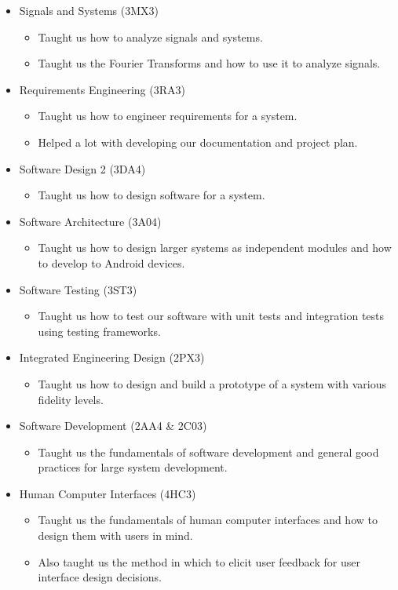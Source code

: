 \documentclass{article}
\begin{document}
\begin{itemize}
    \item Signals and Systems (3MX3)
    \begin{itemize}
        \item Taught us how to analyze signals and systems.
        \item Taught us the Fourier Transforms and how to use it to analyze 
        signals.
    \end{itemize}
    \item Requirements Engineering (3RA3)
    \begin{itemize}
        \item Taught us how to engineer requirements for a system.
        \item Helped a lot with developing our documentation and project plan. 
    \end{itemize}
    \item Software Design 2 (3DA4)
    \begin{itemize}
        \item Taught us how to design software for a system.
    \end{itemize}
    \item Software Architecture (3A04)
    \begin{itemize}
        \item Taught us how to design larger systems as independent modules
        and how to develop to Android devices. 
    \end{itemize}
    \item Software Testing (3ST3)
    \begin{itemize}
        \item Taught us how to test our software with unit tests and integration
         tests using testing frameworks.
    \end{itemize}
    \item Integrated Engineering Design (2PX3)
    \begin{itemize}
        \item Taught us how to design and build a prototype of a system with 
        various fidelity levels. 
    \end{itemize}
    \item Software Development (2AA4 \& 2C03)
    \begin{itemize}
        \item Taught us the fundamentals of software development and general 
        good practices for large system development. 
    \end{itemize}
    \item Human Computer Interfaces (4HC3)
    \begin{itemize}
        \item Taught us the fundamentals of human computer interfaces and 
        how to design them with users in mind. 
        \item Also taught us the method in which to elicit user feedback for 
        user interface design decisions. 
    \end{itemize}
\end{itemize}
\end{document}
